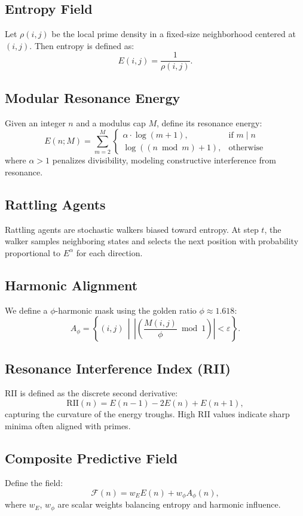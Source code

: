 \documentclass[12pt]{article}
\begin{document}
\subsection{Entropy Field}
Let $\rho(i,j)$ be the local prime density in a fixed-size neighborhood centered at $(i,j)$. Then entropy is defined as:
\[
E(i,j) = \frac{1}{\rho(i,j)}.
\]

\subsection{Modular Resonance Energy}
Given an integer $n$ and a modulus cap $M$, define its resonance energy:
\[
E(n; M) = \sum_{m=2}^{M}
\begin{cases}
\alpha \cdot \log(m+1), & \text{if } m \mid n \\
\log((n \bmod m) + 1), & \text{otherwise}
\end{cases}
\]
where $\alpha > 1$ penalizes divisibility, modeling constructive interference from resonance.

\subsection{Rattling Agents}
Rattling agents are stochastic walkers biased toward entropy. At step $t$, the walker samples neighboring states and selects the next position with probability proportional to $E^\alpha$ for each direction.

\subsection{Harmonic Alignment}
We define a $\phi$-harmonic mask using the golden ratio $\phi \approx 1.618$:
\[
A_\phi = \left\{ (i, j) \,\middle|\, \left| \left( \frac{M(i,j)}{\phi} \bmod 1 \right) \right| < \varepsilon \right\}.
\]

\subsection{Resonance Interference Index (RII)}
RII is defined as the discrete second derivative:
\[
\text{RII}(n) = E(n-1) - 2E(n) + E(n+1),
\]
capturing the curvature of the energy troughs. High RII values indicate sharp minima often aligned with primes.

\subsection{Composite Predictive Field}
Define the field:
\[
\mathcal{F}(n) = w_E E(n) + w_\phi A_\phi(n),
\]
where $w_E$, $w_\phi$ are scalar weights balancing entropy and harmonic influence.
\end{document}
